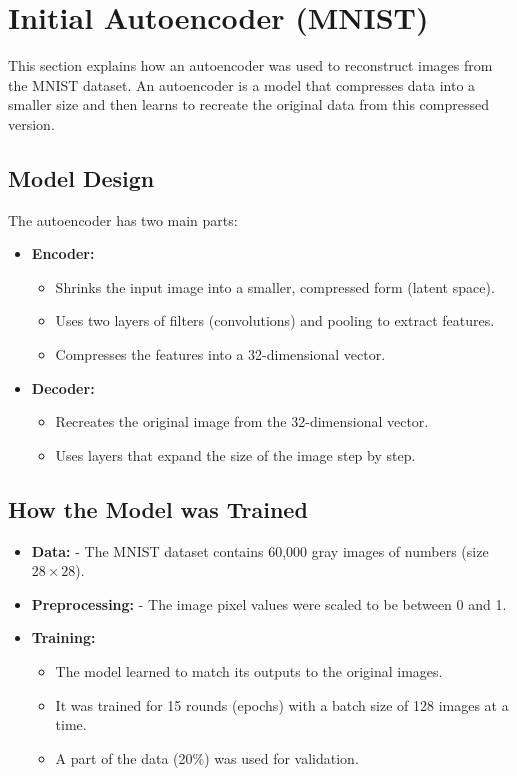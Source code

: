 \documentclass[lettersize,journal]{IEEEtran}
\begin{document}
\section{\textbf{Initial Autoencoder (MNIST)}}

This section explains how an autoencoder was used to reconstruct images from the MNIST dataset. An autoencoder is a model that compresses data into a smaller size and then learns to recreate the original data from this compressed version.

\subsection{\textbf{Model Design}}
The autoencoder has two main parts:
\begin{itemize}
    \item \textbf{Encoder:} 
    \begin{itemize}
        \item Shrinks the input image into a smaller, compressed form (latent space).
        \item Uses two layers of filters (convolutions) and pooling to extract features.
        \item Compresses the features into a 32-dimensional vector.
    \end{itemize}
    \item \textbf{Decoder:}
    \begin{itemize}
        \item Recreates the original image from the 32-dimensional vector.
        \item Uses layers that expand the size of the image step by step.
    \end{itemize}
\end{itemize}

\subsection{\textbf{How the Model was Trained}}
\begin{itemize}
    \item \textbf{Data:} 
    - The MNIST dataset contains 60,000 gray images of numbers (size $28 \times 28$).
    \item \textbf{Preprocessing:} 
    - The image pixel values were scaled to be between 0 and 1.
    \item \textbf{Training:}
    \begin{itemize}
        \item The model learned to match its outputs to the original images.
        \item It was trained for 15 rounds (epochs) with a batch size of 128 images at a time.
        \item A part of the data (20\%) was used for validation.
    \end{itemize}
\end{itemize}
\end{document}

